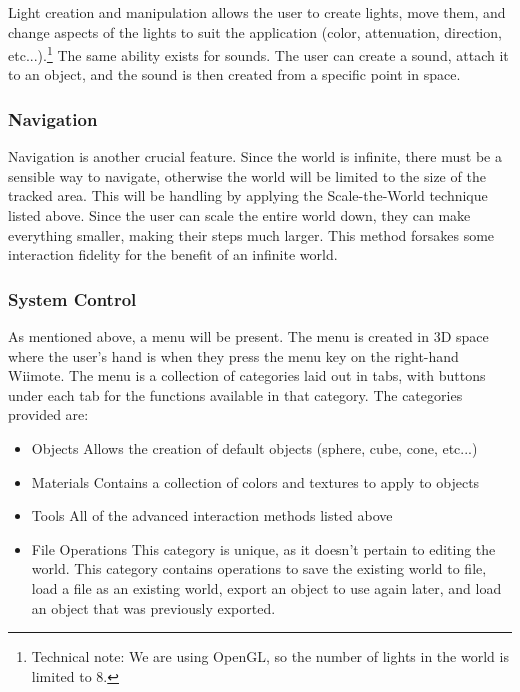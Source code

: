 Light creation and manipulation allows the user to create lights, move them, and change aspects of the lights to suit the application (color, attenuation, direction, etc...).\footnote{Technical note: We are using OpenGL, so the number of lights in the world is limited to 8.}
The same ability exists for sounds.
The user can create a sound, attach it to an object, and the sound is then created from a specific point in space.

\subsubsection{Navigation}
Navigation is another crucial feature.
Since the world is infinite, there must be a sensible way to navigate, otherwise the world will be limited to the size of the tracked area.
This will be handling by applying the Scale-the-World technique listed above.
Since the user can scale the entire world down, they can make everything smaller, making their steps much larger.
This method forsakes some interaction fidelity for the benefit of an infinite world.

\subsubsection{System Control}
As mentioned above, a menu will be present.
The menu is created in 3D space where the user's hand is when they press the menu key on the right-hand Wiimote.
The menu is a collection of categories laid out in tabs, with buttons under each tab for the functions available in that category.
The categories provided are:
\begin{itemize}
	\item Objects
	\subitem Allows the creation of default objects (sphere, cube, cone, etc...)
	\item Materials
	\subitem Contains a collection of colors and textures to apply to objects
	\item Tools
	\subitem All of the advanced interaction methods listed above
	\item File Operations
	\subitem This category is unique, as it doesn't pertain to editing the world.  This category contains operations to save the existing world to file, load a file as an existing world, export an object to use again later, and load an object that was previously exported.
\end{itemize}